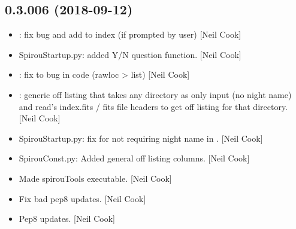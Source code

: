 \documentclass[a4paper,10pt,english]{report}
\begin{document}
\subsection{0.3.006 (2018-09-12)}
\label{\detokenize{misc/changelog:id328}}\begin{itemize}
\item {} 
: fix bug and add to index (if prompted by user) {[}Neil
Cook{]}

\item {} 
SpirouStartup.py: added Y/N question function. {[}Neil Cook{]}

\item {} 
: fix to bug in code (rawloc \textendash{}\textgreater{} list) {[}Neil Cook{]}

\item {} 
: generic off listing that takes any directory as only
input (no night name) and read’s index.fits /  fits file headers to
get off listing for that directory. {[}Neil Cook{]}

\item {} 
SpirouStartup.py: fix for not requiring night name in .
{[}Neil Cook{]}

\item {} 
SpirouConst.py: Added general off listing columns. {[}Neil Cook{]}

\item {} 
Made spirouTools executable. {[}Neil Cook{]}

\item {} 
Fix bad pep8 updates. {[}Neil Cook{]}

\item {} 
Pep8 updates. {[}Neil Cook{]}

\end{itemize}
\end{document}
